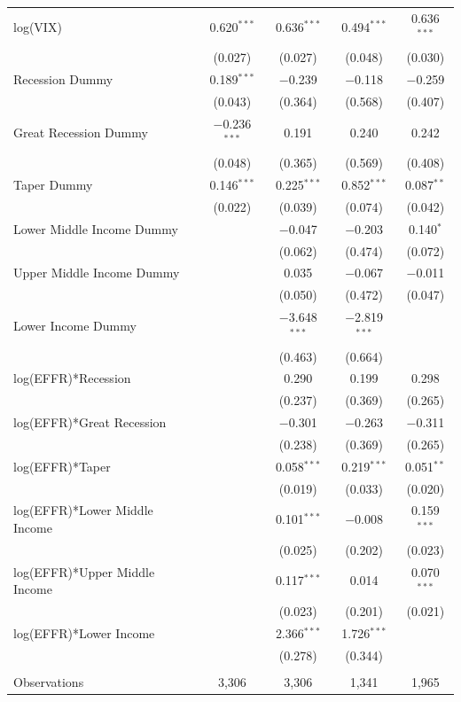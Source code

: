 \documentclass[12pt]{article}
\begin{document}
\begin{table}[!htbp]
\begin{tabular}{@{\extracolsep{5pt}}lcccc}
  log(VIX) & 0.620$^{***}$ & 0.636$^{***}$ & 0.494$^{***}$ & 0.636$^{***}$ \\ 
  & (0.027) & (0.027) & (0.048) & (0.030) \\ 
  Recession Dummy & 0.189$^{***}$ & $-$0.239 & $-$0.118 & $-$0.259 \\ 
  & (0.043) & (0.364) & (0.568) & (0.407) \\ 
  Great Recession Dummy & $-$0.236$^{***}$ & 0.191 & 0.240 & 0.242 \\ 
  & (0.048) & (0.365) & (0.569) & (0.408) \\ 
  Taper Dummy & 0.146$^{***}$ & 0.225$^{***}$ & 0.852$^{***}$ & 0.087$^{**}$ \\ 
  & (0.022) & (0.039) & (0.074) & (0.042) \\ 
  Lower Middle Income Dummy &  & $-$0.047 & $-$0.203 & 0.140$^{*}$ \\ 
  &  & (0.062) & (0.474) & (0.072) \\ 
  Upper Middle Income Dummy &  & 0.035 & $-$0.067 & $-$0.011 \\ 
  &  & (0.050) & (0.472) & (0.047) \\ 
  Lower Income Dummy &  & $-$3.648$^{***}$ & $-$2.819$^{***}$ &  \\ 
  &  & (0.463) & (0.664) &  \\ 
  log(EFFR)*Recession &  & 0.290 & 0.199 & 0.298 \\ 
  &  & (0.237) & (0.369) & (0.265) \\ 
  log(EFFR)*Great Recession &  & $-$0.301 & $-$0.263 & $-$0.311 \\ 
  &  & (0.238) & (0.369) & (0.265) \\ 
  log(EFFR)*Taper &  & 0.058$^{***}$ & 0.219$^{***}$ & 0.051$^{**}$ \\ 
  &  & (0.019) & (0.033) & (0.020) \\ 
  log(EFFR)*Lower Middle Income &  & 0.101$^{***}$ & $-$0.008 & 0.159$^{***}$ \\ 
  &  & (0.025) & (0.202) & (0.023) \\ 
  log(EFFR)*Upper Middle Income &  & 0.117$^{***}$ & 0.014 & 0.070$^{***}$ \\ 
  &  & (0.023) & (0.201) & (0.021) \\ 
  log(EFFR)*Lower Income &  & 2.366$^{***}$ & 1.726$^{***}$ &  \\ 
  &  & (0.278) & (0.344) &  \\ 
 \hline \\[-1.8ex] 
Observations & 3,306 & 3,306 & 1,341 & 1,965 \\ 

\end{tabular}
\end{table}
\end{document}
